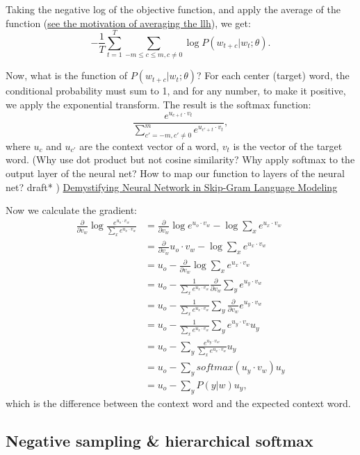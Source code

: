 \documentclass{report}
\begin{document}
	Taking the negative log of the objective function, and apply the average of the function (\href{https://stats.stackexchange.com/q/267847/354019}{see the motivation of averaging the llh}), we get: \[
	-\frac{1}{T} \sum_{t=1}^{T} \sum_{-m \le c \le m, c \neq 0} \log P(w_{t+c} | w_t; \theta)	
	.\]

	Now, what is the function of $P(w_{t+c} | w_t; \theta)$? For each center (target) word, the conditional probability must sum to 1, and for any number, to make it positive, we apply the exponential transform. The result is the softmax function: 
	\[
		\frac{e^{u_{c + t} \cdot v_t}}{\sum_{c' = -m, c' \neq 0}^{m} e^{u_{c' + t} \cdot v_t}}
	,\] where $u_c$ and $u_{c'}$ are the context vector of a word, $v_t$ is the vector of the target word. (Why use dot product but not cosine similarity? Why apply softmax to the output layer of the neural net? How to map our function to layers of the neural net? draft* ) \href{https://aegis4048.github.io/demystifying_neural_network_in_skip_gram_language_modeling}{Demystifying Neural Network in Skip-Gram Language Modeling}

Now we calculate the gradient:
\begin{align*}
	\frac{\partial}{\partial v_w} \log
	\frac{e^{u_o \cdot v_w}}{\sum_{x} e^{u_x \cdot v_w}} &= \frac{\partial}{\partial v_w} \log e^{u_o \cdot v_w} - \log \sum_{x} e^{u_x \cdot v_w} \\
									  &= \frac{\partial }{\partial v_w} u_o \cdot v_w -  \log \sum_{x} e^{u_{x} \cdot v_w} \\
									  &= u_o - \frac{\partial }{\partial v_w} \log \sum_{x} e^{u_x \cdot v_w} \\
									  &= u_o - \frac{1}{\sum_{x} e^{u_x \cdot v_w}} \frac{\partial }{\partial v_w} \sum_{y} e^{u_y \cdot v_w} \\
									  &= u_o - \frac{1}{\sum_{x} e^{u_x \cdot v_w}}  \sum_{y} \frac{\partial }{\partial v_w} e^{u_y \cdot v_w} \\ 
									  &= u_o - \frac{1}{\sum_{x} e^{u_x \cdot v_w}}  \sum_{y} e^{u_y \cdot v_w} u_y \\ 
									  &= u_o - \sum_{y}  \frac{e^{u_y \cdot v_w}}{\sum_{x} e^{u_x \cdot v_w}} u_y \\
									  &= u_o - \sum_{y} softmax(u_y \cdot v_w) u_y \\
									  &= u_o - \sum_{y} P(y|w) u_y
,\end{align*}
which is the difference between the context word and the expected context word.
\subsection{Negative sampling \& hierarchical softmax}
\end{document}
